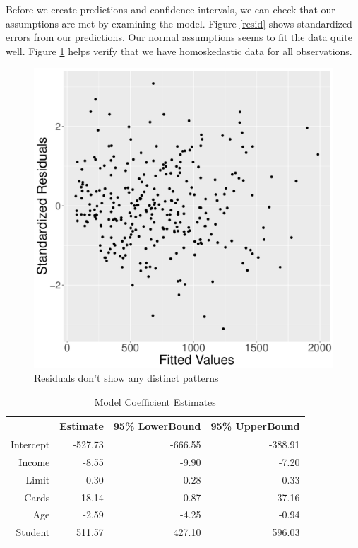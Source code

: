 \documentclass{article}
\begin{document}
Before we create predictions and confidence intervals, we can check that our assumptions are met by examining the model. Figure \ref{resid} shows standardized errors from our predictions. Our normal assumptions seems to fit the data quite well. Figure \ref{fitted} helps verify that we have homoskedastic data for all observations.  

\begin{figure}
\centering
\includegraphics[scale=.3]{fitted.pdf}
\caption{Residuals don't show any distinct patterns}
\label{fitted}
\end{figure}


\begin{table}[ht]
\centering
\begin{tabular}{rrrr}
  \hline
 & Estimate & 95\% LowerBound & 95\% UpperBound \\ 
  \hline
Intercept & -527.73 & -666.55 & -388.91 \\ 
  Income & -8.55 & -9.90 & -7.20 \\ 
  Limit & 0.30 & 0.28 & 0.33 \\ 
  Cards & 18.14 & -0.87 & 37.16 \\ 
  Age & -2.59 & -4.25 & -0.94 \\ 
  Student & 511.57 & 427.10 & 596.03 \\ 
   \hline
\end{tabular}
\caption{Model Coefficient Estimates} 
\label{coefs}
\end{table}
\end{document}

